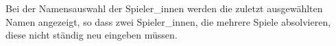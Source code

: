 Bei der Namensauswahl der Spieler\_innen werden die zuletzt ausgewählten Namen angezeigt,
so dass zwei Spieler\_innen, die mehrere Spiele absolvieren, diese nicht ständig neu eingeben müssen.